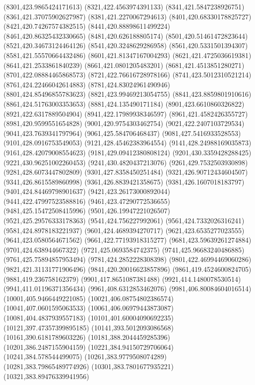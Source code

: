 {(8301,423.9865424171613)
(8321,422.4563974391133)
(8341,421.5847238926751)
(8361,421.37075902627987)
(8381,421.2270067294613)
(8401,420.68330178825727)
(8421,420.74267574382515)
(8441,420.88898611499224)
(8461,420.86325432330665)
(8481,420.626188805174)
(8501,420.51461472823644)
(8521,420.34673124464126)
(8541,420.3248629286958)
(8561,420.5331501394307)
(8581,421.55570664432486)
(8601,421.81347167004293)
(8621,421.4725036619381)
(8641,421.2533861840239)
(8661,421.0801205483201)
(8681,421.4513851280271)
(8701,422.08884465868573)
(8721,422.76616728978166)
(8741,423.5012310521214)
(8761,424.22466042614883)
(8781,424.83024961490946)
(8801,424.85496855783623)
(8821,423.99469213054755)
(8841,423.8859801910616)
(8861,424.51763003353653)
(8881,424.135490171184)
(8901,423.6610860326822)
(8921,422.6317889504904)
(8941,422.17989938346597)
(8961,421.4582426355727)
(8981,420.9599551654828)
(9001,420.9754303462754)
(9021,422.2407103729534)
(9041,423.7639341797964)
(9061,425.584706468437)
(9081,427.5416933528553)
(9101,428.0916753549053)
(9121,428.45462383964554)
(9141,428.24988169035873)
(9161,428.42079008554623)
(9181,429.09412380808124)
(9201,430.3359428288425)
(9221,430.96251002260453)
(9241,430.4820437213076)
(9261,429.7532503930898)
(9281,428.6073447802809)
(9301,427.8358450251484)
(9321,426.90712434604507)
(9341,426.8615589860998)
(9361,426.8839421358675)
(9381,426.1607018183797)
(9401,424.84469798901637)
(9421,423.26173000892044)
(9441,422.47997523588816)
(9461,423.47290772536655)
(9481,425.15472508415996)
(9501,426.19947221026507)
(9521,425.29576333178363)
(9541,424.756227992061)
(9561,424.7332026316241)
(9581,424.8978183221937)
(9601,424.4689394270717)
(9621,423.6535277023555)
(9641,423.0580564671562)
(9661,422.77193918315277)
(9681,423.59639261274884)
(9701,424.638944667322)
(9721,425.0693584742375)
(9741,425.96683240486885)
(9761,425.75894857953494)
(9781,424.2852228308398)
(9801,422.46994469060286)
(9821,421.31131771906496)
(9841,420.20016623857896)
(9861,419.4524600824705)
(9881,419.236758162379)
(9901,417.8651087381488)
(9921,414.1480078530514)
(9941,411.01196371356434)
(9961,408.6312853462076)
(9981,406.80084604016514)
(10001,405.9466449221085)
(10021,406.08754802386574)
(10041,407.0601595063533)
(10061,406.06979443873087)
(10081,404.4837939557183)
(10101,401.60004090692235)
(10121,397.47357399895185)
(10141,393.5012093086568)
(10161,390.6181789603226)
(10181,388.2044459285396)
(10201,386.2487155904159)
(10221,384.94150729706064)
(10241,384.578544499075)
(10261,383.9779508074289)
(10281,383.79865489774926)
(10301,383.7801677935221)
(10321,383.89476339941956)
}
